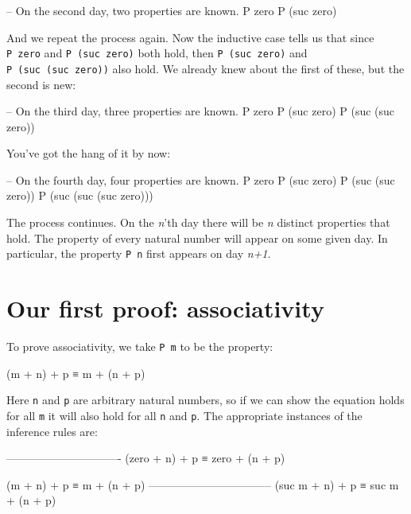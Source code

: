 \begin{myDisplay}
-- On the second day, two properties are known.
P zero
P (suc zero)
\end{myDisplay}

And we repeat the process again. Now the inductive case tells us that
since \texttt{P\ zero} and \texttt{P\ (suc\ zero)} both hold, then
\texttt{P\ (suc\ zero)} and \texttt{P\ (suc\ (suc\ zero))} also hold. We
already knew about the first of these, but the second is new:

\begin{myDisplay}
-- On the third day, three properties are known.
P zero
P (suc zero)
P (suc (suc zero))
\end{myDisplay}

You've got the hang of it by now:

\begin{myDisplay}
-- On the fourth day, four properties are known.
P zero
P (suc zero)
P (suc (suc zero))
P (suc (suc (suc zero)))
\end{myDisplay}

The process continues. On the \emph{n}'th day there will be \emph{n}
distinct properties that hold. The property of every natural number will
appear on some given day. In particular, the property \texttt{P\ n}
first appears on day \emph{n+1}.

\hypertarget{our-first-proof-associativity}{%
\section{Our first proof:
associativity}\label{our-first-proof-associativity}}

To prove associativity, we take \texttt{P\ m} to be the property:

\begin{myDisplay}
(m + n) + p ≡ m + (n + p)
\end{myDisplay}

Here \texttt{n} and \texttt{p} are arbitrary natural numbers, so if we
can show the equation holds for all \texttt{m} it will also hold for all
\texttt{n} and \texttt{p}. The appropriate instances of the inference
rules are:

\begin{myDisplay}
-------------------------------
(zero + n) + p ≡ zero + (n + p)

(m + n) + p ≡ m + (n + p)
---------------------------------
(suc m + n) + p ≡ suc m + (n + p)
\end{myDisplay}

